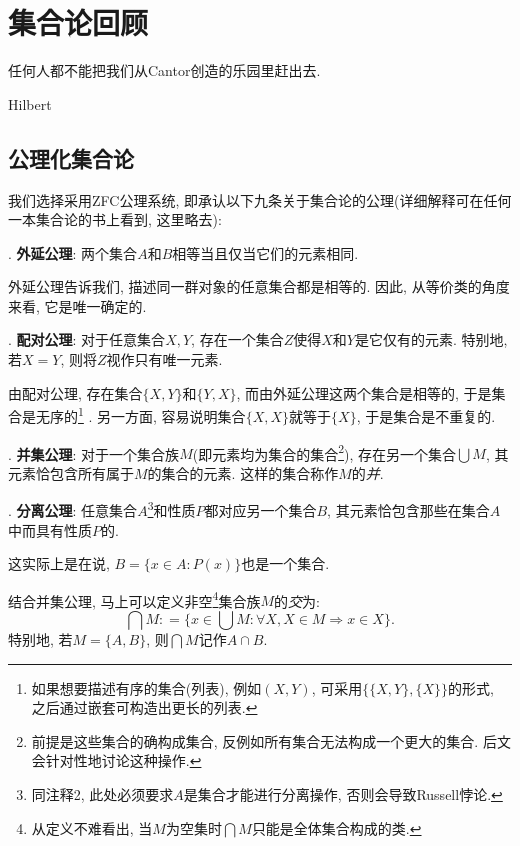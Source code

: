 \chapter{集合论回顾}

\epigraph{任何人都不能把我们从Cantor创造的乐园里赶出去. }{Hilbert}

\section{公理化集合论}

我们选择采用ZFC公理系统, 即承认以下九条关于集合论的公理(详细解释可在任何一本集合论的书上看到, 这里略去): 

\vspace{0.5em}
. \textbf{外延公理}: 两个集合$A$和$B$相等当且仅当它们的元素相同. 

外延公理告诉我们, 描述同一群对象的任意集合都是相等的. 因此, 从等价类的角度来看, 它是唯一确定的. 

\vspace{0.5em}
. \textbf{配对公理}: 对于任意集合$X, Y$, 存在一个集合$Z$使得$X$和$Y$是它仅有的元素. 特别地, 若$X=Y$, 则将$Z$视作只有唯一元素. 

由配对公理, 存在集合$\{ X, Y \}$和$\{ Y, X \}$, 而由外延公理这两个集合是相等的, 于是集合是无序的\footnote{如果想要描述有序的集合(列表), 例如$(X,Y)$, 可采用$\{ \{ X,Y \}, \{X\} \}$的形式, 之后通过嵌套可构造出更长的列表. } . 另一方面, 容易说明集合$\{ X, X \}$就等于$\{ X \}$, 于是集合是不重复的. 

\vspace{0.5em}
. \textbf{并集公理}: 对于一个集合族$M$(即元素均为集合的集合\footnote{前提是这些集合的确构成集合, 反例如所有集合无法构成一个更大的集合. 后文会针对性地讨论这种操作. }), 存在另一个集合$\bigcup M$, 其元素恰包含所有属于$M$的集合的元素. 这样的集合称作$M$的\textit{并}. 

\vspace{0.5em}
. \textbf{分离公理}: 任意集合$A$\footnote{同注释2, 此处必须要求$A$是集合才能进行分离操作, 否则会导致Russell悖论. }和性质$P$都对应另一个集合$B$, 其元素恰包含那些在集合$A$中而具有性质$P$的. 

这实际上是在说, $B=\{ x \in A :  P(x) \}$也是一个集合. 

结合并集公理, 马上可以定义非空\footnote{从定义不难看出, 当$M$为空集时$\bigcap M$只能是全体集合构成的类. }集合族$M$的\textit{交}为: $$\bigcap M : = \{ x \in \bigcup M :  \forall X, X \in M \Rightarrow x \in X \}.$$
特别地, 若$M= \{ A, B \}$, 则$\bigcap M$记作$A \cap B$. 

